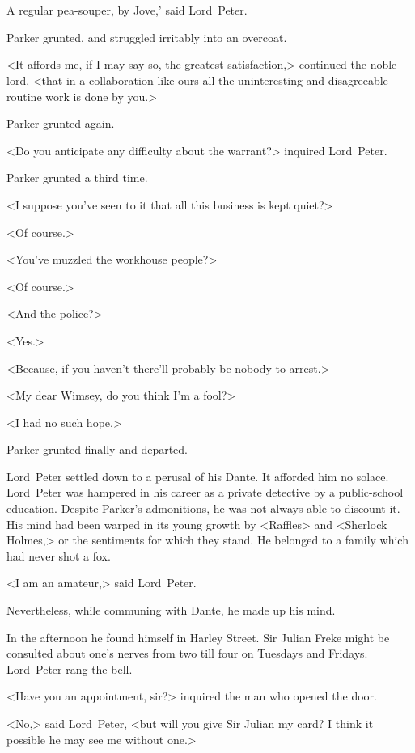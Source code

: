\chapter[Chapter \thechapter]{}
\lettrine[ante=‘]{A}{} regular pea-souper, by Jove,' said Lord~Peter.

\zz
Parker grunted, and struggled irritably into an overcoat.

\zz
<It affords me, if I may say so, the greatest satisfaction,> continued the noble lord, <that in a collaboration like ours all the uninteresting and disagreeable routine work is done by you.>

Parker grunted again.

<Do you anticipate any difficulty about the warrant?> inquired Lord~Peter.

Parker grunted a third time.

<I suppose you've seen to it that all this business is kept quiet?>

<Of course.>

<You've muzzled the workhouse people?>

<Of course.>

<And the police?>

<Yes.>

<Because, if you haven't there'll probably be nobody to arrest.>

<My dear Wimsey, do you think I'm a fool?>

<I had no such hope.>

Parker grunted finally and departed.

Lord~Peter settled down to a perusal of his Dante. It afforded him no solace. Lord~Peter was hampered in his career as a private detective by a public-school education. Despite Parker's admonitions, he was not always able to discount it. His mind had been warped in its young growth by <Raffles> and <Sherlock Holmes,> or the sentiments for which they stand. He belonged to a family which had never shot a fox.

<I am an amateur,> said Lord~Peter.

Nevertheless, while communing with Dante, he made up his mind.

In the afternoon he found himself in Harley Street. Sir Julian Freke might be consulted about one's nerves from two till four on Tuesdays and Fridays. Lord~Peter rang the bell.

<Have you an appointment, sir?> inquired the man who opened the door.

<No,> said Lord~Peter, <but will you give Sir Julian my card? I think it possible he may see me without one.>

